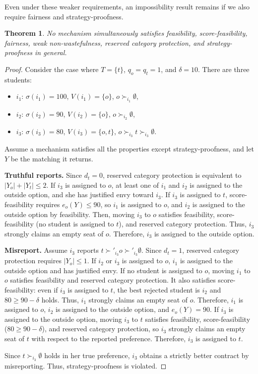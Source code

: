 \documentclass[a4paper,twoside]{article}
\newtheorem{theorem}{Theorem}
\theoremstyle{definition}
\begin{document}
Even under these weaker requirements, an impossibility result remains if we also
require fairness and strategy-proofness.

\begin{theorem}
\label{thm:imp2}
No mechanism simultaneously satisfies feasibility, score-feasibility, fairness, weak
non-wastefulness, reserved category protection, and strategy-proofness in general.
\end{theorem}
\begin{proof}
Consider the case where $T=\{t\}$, $q_o=q_t=1$, and $\delta=10$.
There are three students:
\begin{itemize}
\item $i_1$: $\sigma(i_1)=100$, $V(i_1)=\{o\}$, $o\succ_{i_1}\emptyset$,
\item $i_2$: $\sigma(i_2)=90$, $V(i_2)=\{o\}$, $o\succ_{i_2}\emptyset$,
\item $i_3$: $\sigma(i_3)=80$, $V(i_3)=\{o,t\}$,
$o\succ_{i_3}t\succ_{i_3}\emptyset$.
\end{itemize}
Assume a mechanism satisfies all the properties except strategy-proofness, and let $Y$
be the matching it returns.

\textbf{Truthful reports.}
Since $d_t=0$, reserved category protection is equivalent to $|Y_o|+|Y_t|\le 2$.
If $i_3$ is assigned to $o$, at least one of $i_1$ and $i_2$ is assigned to the outside
option, and she has justified envy toward $i_3$.
If $i_3$ is assigned to $t$, score-feasibility requires $e_o(Y)\le 90$, so $i_1$ is
assigned to $o$, and $i_2$ is assigned to the outside option by feasibility.
Then, moving $i_3$ to $o$ satisfies feasibility, score-feasibility (no student is
assigned to $t$), and reserved category protection.
Thus, $i_3$ strongly claims an empty seat of $o$.
Therefore, $i_3$ is assigned to the outside option.

\textbf{Misreport.}
Assume $i_3$ reports $t\succ'_{i_3}o\succ'_{i_3}\emptyset$.
Since $d_t=1$, reserved category protection requires $|Y_o|\le 1$.
If $i_2$ or $i_3$ is assigned to $o$, $i_1$ is assigned to the outside option and has
justified envy.
If no student is assigned to $o$, moving $i_1$ to $o$ satisfies feasibility and reserved
category protection. It also satisfies score-feasibility: even if $i_3$ is assigned to
$t$, the best rejected student is $i_2$ and $80\ge 90-\delta$ holds.
Thus, $i_1$ strongly claims an empty seat of $o$.
Therefore, $i_1$ is assigned to $o$, $i_2$ is assigned to the outside option, and
$e_o(Y)=90$.
If $i_3$ is assigned to the outside option, moving $i_3$ to $t$ satisfies feasibility,
score-feasibility ($80\ge 90-\delta$), and reserved category protection, so $i_3$
strongly claims an empty seat of $t$ with respect to the reported preference.
Therefore, $i_3$ is assigned to $t$.

Since $t\succ_{i_3}\emptyset$ holds in her true preference, $i_3$ obtains a strictly
better contract by misreporting. Thus, strategy-proofness is violated.
\end{proof}
\end{document}
